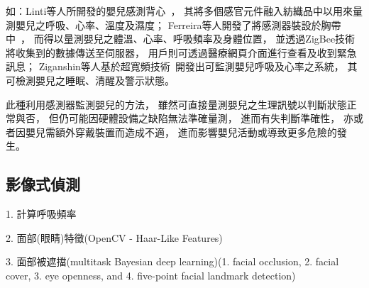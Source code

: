 \documentclass[class=NCU_thesis, crop=false]{standalone}
\begin{document}
如：Linti等人所開發的嬰兒感測背心~\cite{lintiSensoryBabyVestForTheMonitoringOfInfants2006}，
其將多個感官元件融入紡織品中以用來量測嬰兒之呼吸、心率、溫度及濕度；
Ferreira等人開發了將感測器裝設於胸帶中~\cite{ferreiraASmartWearableSystemForSuddenInfantDeathSyndromeMonitoring2016}，
而得以量測嬰兒之體溫、心率、呼吸頻率及身體位置，
並透過ZigBee技術將收集到的數據傳送至伺服器，
用戶則可透過醫療網頁介面進行查看及收到緊急訊息；
Ziganshin等人基於超寬頻技術~\cite{ziganshinUWBBabyMonitor2010}開發出可監測嬰兒呼吸及心率之系統，
其可檢測嬰兒之睡眠、清醒及警示狀態。

此種利用感測器監測嬰兒的方法，
雖然可直接量測嬰兒之生理訊號以判斷狀態正常與否，
但仍可能因硬體設備之缺陷無法準確量測，
進而有失判斷準確性，
亦或者因嬰兒需額外穿戴裝置而造成不適，
進而影響嬰兒活動或導致更多危險的發生。




\subsection{影像式偵測}
1. 計算呼吸頻率

2. 面部(眼睛)特徵(OpenCV - Haar-Like Features)

3. 面部被遮擋(multitask Bayesian deep learning)(1. facial occlusion, 2. facial cover, 3. eye openness, and 4. five-point facial landmark detection)
\end{document}
